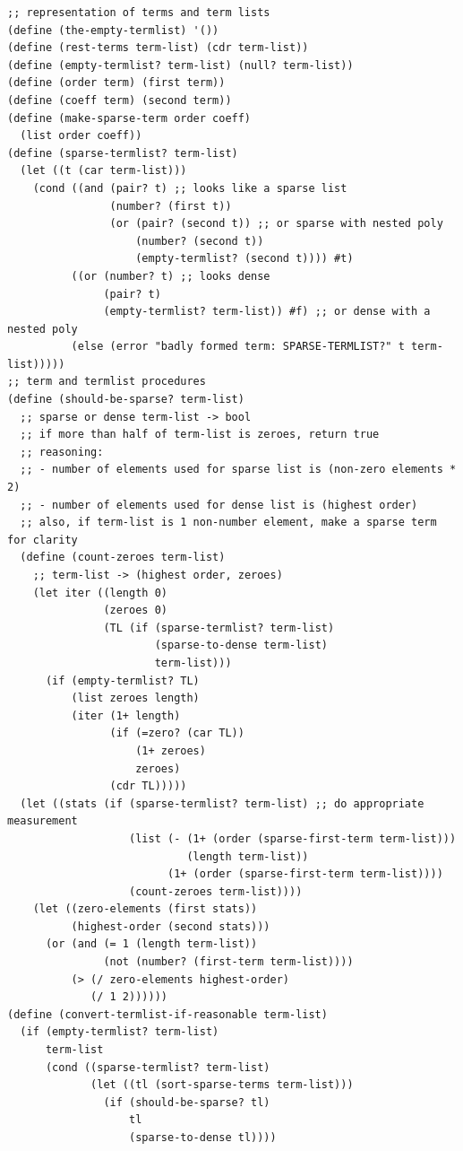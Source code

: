 \documentclass[final,fleqn,titlepage,twoside]{article}
\begin{document}
\begin{verbatim}
;; representation of terms and term lists
(define (the-empty-termlist) '())
(define (rest-terms term-list) (cdr term-list))
(define (empty-termlist? term-list) (null? term-list))
(define (order term) (first term))
(define (coeff term) (second term))
(define (make-sparse-term order coeff)
  (list order coeff))
(define (sparse-termlist? term-list)
  (let ((t (car term-list)))
    (cond ((and (pair? t) ;; looks like a sparse list
                (number? (first t))
                (or (pair? (second t)) ;; or sparse with nested poly
                    (number? (second t))
                    (empty-termlist? (second t)))) #t)
          ((or (number? t) ;; looks dense
               (pair? t)
               (empty-termlist? term-list)) #f) ;; or dense with a nested poly
          (else (error "badly formed term: SPARSE-TERMLIST?" t term-list)))))
;; term and termlist procedures
(define (should-be-sparse? term-list)
  ;; sparse or dense term-list -> bool
  ;; if more than half of term-list is zeroes, return true
  ;; reasoning:
  ;; - number of elements used for sparse list is (non-zero elements * 2)
  ;; - number of elements used for dense list is (highest order)
  ;; also, if term-list is 1 non-number element, make a sparse term for clarity
  (define (count-zeroes term-list)
    ;; term-list -> (highest order, zeroes)
    (let iter ((length 0)
               (zeroes 0)
               (TL (if (sparse-termlist? term-list)
                       (sparse-to-dense term-list)
                       term-list)))
      (if (empty-termlist? TL)
          (list zeroes length)
          (iter (1+ length)
                (if (=zero? (car TL))
                    (1+ zeroes)
                    zeroes)
                (cdr TL)))))
  (let ((stats (if (sparse-termlist? term-list) ;; do appropriate measurement
                   (list (- (1+ (order (sparse-first-term term-list)))
                            (length term-list))
                         (1+ (order (sparse-first-term term-list))))
                   (count-zeroes term-list))))
    (let ((zero-elements (first stats))
          (highest-order (second stats)))
      (or (and (= 1 (length term-list))
               (not (number? (first-term term-list))))
          (> (/ zero-elements highest-order)
             (/ 1 2))))))
(define (convert-termlist-if-reasonable term-list)
  (if (empty-termlist? term-list)
      term-list
      (cond ((sparse-termlist? term-list)
             (let ((tl (sort-sparse-terms term-list)))
               (if (should-be-sparse? tl)
                   tl
                   (sparse-to-dense tl))))

\end{verbatim}
\end{document}
